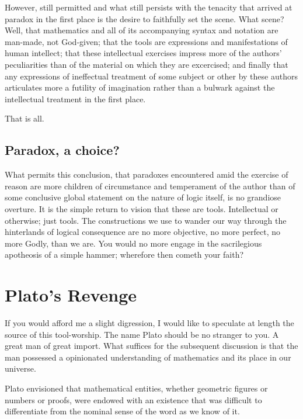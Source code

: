 \documentclass{article}
\begin{document}
	However, still permitted and what still persists with the tenacity that arrived at paradox in the first place is the desire to faithfully set the scene. What scene? Well, that mathematics and all of its accompanying syntax and notation are man-made, not God-given; that the tools are expressions and manifestations of human intellect; that these intellectual exercises impress more of the authors' peculiarities than of the material on which they are excercised; and finally that any expressions of ineffectual treatment of some subject or other by these authors articulates more a futility of imagination rather than a bulwark against the intellectual treatment in the first place.
	
	That is all.
	
	\subsection{Paradox, a choice?}
	
	What permits this conclusion, that paradoxes encountered amid the exercise of reason are more children of circumstance and temperament of the author than of some conclusive global statement on the nature of logic itself, is no grandiose overture. It is the simple return to vision that these are tools. Intellectual or otherwise; just tools. The constructions we use to wander our way through the hinterlands of logical consequence are no more objective, no more perfect, no more Godly, than we are. You would no more engage in the sacrilegious apotheosis of a simple hammer; wherefore then cometh your faith?
	
	\section{Plato's Revenge}
	
	If you would afford me a slight digression, I would like to speculate at length the source of this tool-worship. The name Plato should be no stranger to you. A great man of great import. What suffices for the subsequent discussion is that the man possessed a opinionated understanding of mathematics and its place in our universe.
	
	Plato envisioned that mathematical entities, whether geometric figures or numbers or proofs, were endowed with an existence that was difficult to differentiate from the nominal sense of the word as we know of it. 
\end{document}
